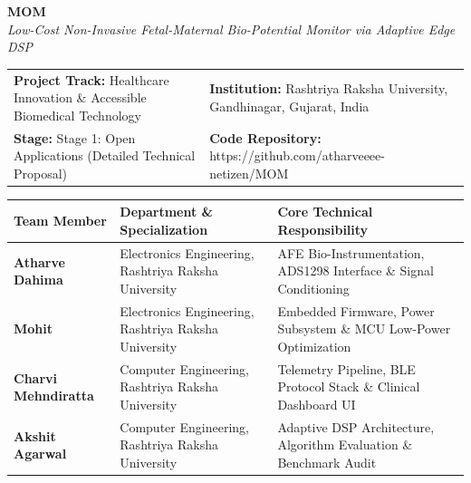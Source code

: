 \documentclass[10pt,a4paper]{article}
\begin{document}
\begin{center}
    {\huge\textbf{MOM}}\\[0.25em]
    {\large\textit{Low-Cost Non-Invasive Fetal-Maternal Bio-Potential Monitor via Adaptive Edge DSP}}\\[0.8em]
\end{center}

\noindent
\begin{tabularx}{\textwidth}{|X|X|}
\hline
\textbf{Project Track:} Healthcare Innovation \& Accessible Biomedical Technology & \textbf{Institution:} Rashtriya Raksha University, Gandhinagar, Gujarat, India \\
\textbf{Stage:} Stage 1: Open Applications (Detailed Technical Proposal) & \textbf{Code Repository:} https://github.com/atharveeee-netizen/MOM \\
\hline
\end{tabularx}

\vspace{0.6em}

\noindent
\begin{tabularx}{\textwidth}{lXX}
\toprule
\textbf{Team Member} & \textbf{Department \& Specialization} & \textbf{Core Technical Responsibility} \\
\midrule
\textbf{Atharve Dahima} & Electronics Engineering, Rashtriya Raksha University & AFE Bio-Instrumentation, ADS1298 Interface \& Signal Conditioning \\
\textbf{Mohit} & Electronics Engineering, Rashtriya Raksha University & Embedded Firmware, Power Subsystem \& MCU Low-Power Optimization \\
\textbf{Charvi Mehndiratta} & Computer Engineering, Rashtriya Raksha University & Telemetry Pipeline, BLE Protocol Stack \& Clinical Dashboard UI \\
\textbf{Akshit Agarwal} & Computer Engineering, Rashtriya Raksha University & Adaptive DSP Architecture, Algorithm Evaluation \& Benchmark Audit \\
\bottomrule
\end{tabularx}

\vspace{0.8em}
\end{document}
